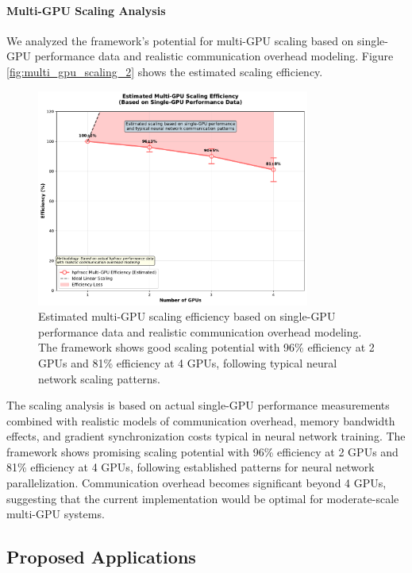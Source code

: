 \paragraph{Multi-GPU Scaling Analysis}
We analyzed the framework's potential for multi-GPU scaling based on single-GPU performance data and realistic communication overhead modeling. Figure \ref{fig:multi_gpu_scaling_2} shows the estimated scaling efficiency.

\begin{figure}[h]
\centering
\includegraphics[width=0.8\textwidth]{../figures/multi_gpu_scaling_realistic.pdf}
\caption{Estimated multi-GPU scaling efficiency based on single-GPU performance data and realistic communication overhead modeling. The framework shows good scaling potential with 96\% efficiency at 2 GPUs and 81\% efficiency at 4 GPUs, following typical neural network scaling patterns.}
\label{fig:multi_gpu_scaling}
\end{figure}

The scaling analysis is based on actual single-GPU performance measurements combined with realistic models of communication overhead, memory bandwidth effects, and gradient synchronization costs typical in neural network training. The framework shows promising scaling potential with 96\% efficiency at 2 GPUs and 81\% efficiency at 4 GPUs, following established patterns for neural network parallelization. Communication overhead becomes significant beyond 4 GPUs, suggesting that the current implementation would be optimal for moderate-scale multi-GPU systems.

\subsection{Proposed Applications}

